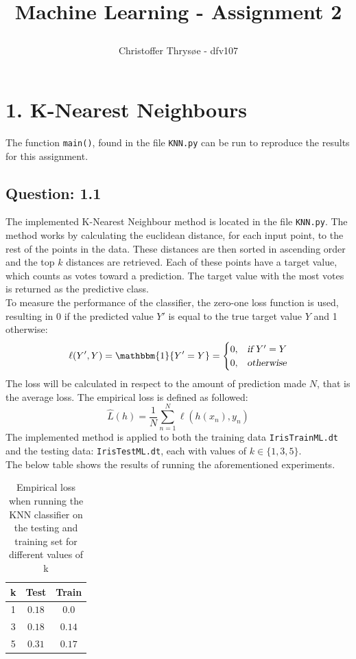 \documentclass{article}
\title{
\vspace{1in}
\textmd{\textbf{Machine Learning - Assignment 2}} \\
\author{Christoffer Thrysøe - dfv107}
}
\begin{document}
\maketitle
{}
\section{1. K-Nearest Neighbours}
The function \texttt{main()}, found in the file \texttt{KNN.py} can be run to reproduce the results for this assignment.
\subsection{Question: 1.1}
The implemented K-Nearest Neighbour method is located in the file \texttt{KNN.py}. The method works by calculating the euclidean distance, for each input point, to the rest of the points in the data. These distances are then sorted in ascending order and the top $k$ distances are retrieved. Each of these points have a target value, which counts as votes toward a prediction. The target value with the most votes is returned as the predictive class.
\\
To measure the performance of the classifier, the zero-one loss function is used, resulting in 0 if the predicted value $Y'$ is equal to the true target value $Y$ and 1 otherwise:
\begin{equation*}
\begin{split}
\ell(Y',Y) =
\mathbbm{1} \lbrace Y'= Y \rbrace =
\begin{cases}
0,& \textsl{if } Y' = Y  \\
0,&  \textsl{otherwise}
\end{cases}
\end{split}
\label{indikator}
\end{equation*}
The loss will be calculated in respect to the amount of prediction made $N$, that is the average loss. The empirical loss is defined as followed:
\begin{equation*}
\hat{L}(h) =  \dfrac{1}{N}\sum\limits^{N}_{n=1} \ell (h(x_n),y_n)
\end{equation*}
The implemented method is applied to both the training data \texttt{IrisTrainML.dt} and the testing data: \texttt{IrisTestML.dt}, each with values of $k \in \lbrace 1,3,5 \rbrace$.
\\
The below table shows the results of running the aforementioned experiments.
\begin{table}[H]
  \centering
  \label{tab:table1}
  \begin{tabular}{c||c|c}
    \textsf{k} & \textsf{Test} & \textsf{Train} \\
    \hline
    1 & $0.18$ & $0.0$ \\
    3 & $0.18$ & $0.14$ \\    
    5 & $0.31$ & $0.17$\\
  \end{tabular}
  \caption{Empirical loss when running the KNN classifier on the testing and training set for different values of k} 
\end{table}
\end{document}

